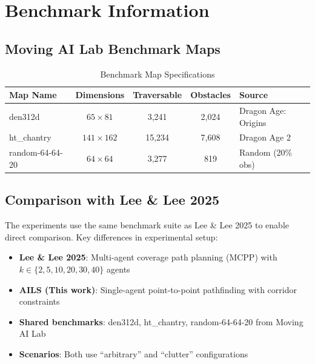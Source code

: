 \documentclass[11pt]{article}
\begin{document}
\section{Benchmark Information}

\subsection{Moving AI Lab Benchmark Maps}

\begin{table}[H]
\centering
\caption{Benchmark Map Specifications}
\label{tab:benchmarks}
\begin{tabular}{@{}lcccl@{}}
\toprule
Map Name & Dimensions & Traversable & Obstacles & Source \\
\midrule
den312d & $65 \times 81$ & 3,241 & 2,024 & Dragon Age: Origins \\
ht\_chantry & $141 \times 162$ & 15,234 & 7,608 & Dragon Age 2 \\
random-64-64-20 & $64 \times 64$ & 3,277 & 819 & Random (20\% obs) \\
\bottomrule
\end{tabular}
\end{table}

\subsection{Comparison with Lee \& Lee 2025}

The experiments use the same benchmark suite as Lee \& Lee 2025 \cite{lee2025mcpp} to enable direct comparison. Key differences in experimental setup:

\begin{itemize}
    \item \textbf{Lee \& Lee 2025}: Multi-agent coverage path planning (MCPP) with $k \in \{2, 5, 10, 20, 30, 40\}$ agents
    \item \textbf{AILS (This work)}: Single-agent point-to-point pathfinding with corridor constraints
    \item \textbf{Shared benchmarks}: den312d, ht\_chantry, random-64-64-20 from Moving AI Lab
    \item \textbf{Scenarios}: Both use ``arbitrary'' and ``clutter'' configurations
\end{itemize}

\end{document}
